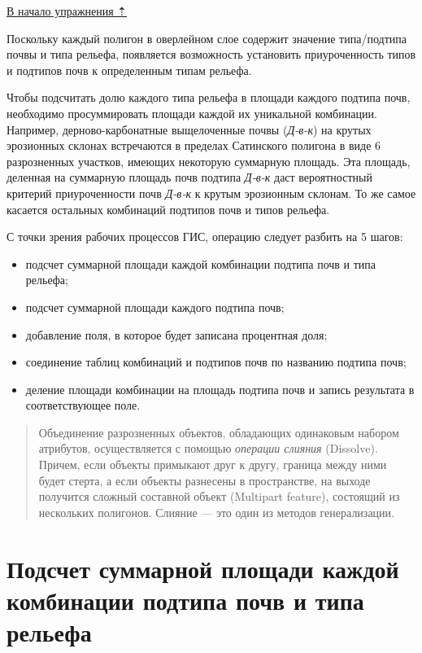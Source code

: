 \documentclass[]{book}
\theoremstyle{definition}
\theoremstyle{definition}
\theoremstyle{definition}
\theoremstyle{remark}
\begin{document}
\protect\hyperlink{overlay}{В начало упражнения ⇡}

Поскольку каждый полигон в оверлейном слое содержит значение
типа/подтипа почвы и типа рельефа, появляется возможность установить
приуроченность типов и подтипов почв к определенным типам рельефа.

Чтобы подсчитать долю каждого типа рельефа в площади каждого подтипа
почв, необходимо просуммировать площади каждой их уникальной комбинации.
Например, дерново-карбонатные выщелоченные почвы (\emph{Д-в-к}) на
крутых эрозионных склонах встречаются в пределах Сатинского полигона в
виде 6 разрозненных участков, имеющих некоторую суммарную площадь. Эта
площадь, деленная на суммарную площадь почв подтипа \emph{Д-в-к} даст
вероятностный критерий приуроченности почв \emph{Д-в-к} к крутым
эрозионным склонам. То же самое касается остальных комбинаций подтипов
почв и типов рельефа.

С точки зрения рабочих процессов ГИС, операцию следует разбить на 5
шагов:

\begin{itemize}
\item
  подсчет суммарной площади каждой комбинации подтипа почв и типа
  рельефа;
\item
  подсчет суммарной площади каждого подтипа почв;
\item
  добавление поля, в которое будет записана процентная доля;
\item
  соединение таблиц комбинаций и подтипов почв по названию подтипа почв;
\item
  деление площади комбинации на площадь подтипа почв и запись результата
  в соответствующее поле.
\end{itemize}

\begin{quote}
Объединение разрозненных объектов, обладающих одинаковым набором
атрибутов, осуществляется с помощью \emph{операции слияния} (Dissolve).
Причем, если объекты примыкают друг к другу, граница между ними будет
стерта, а если объекты разнесены в пространстве, на выходе получится
сложный составной объект (Multipart feature), состоящий из нескольких
полигонов. Слияние --- это один из методов генерализации.
\end{quote}

\hypertarget{overlay-sumarea-combination}{%
\section{Подсчет суммарной площади каждой комбинации подтипа почв и типа
рельефа}\label{overlay-sumarea-combination}}
\end{document}
